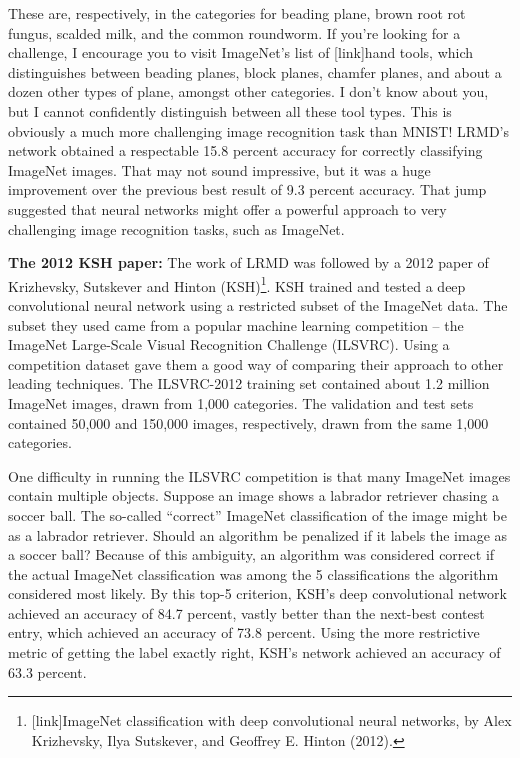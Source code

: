 \documentclass[a4paper,twoside,10pt]{book}
\begin{document}
These are, respectively, in the categories for beading plane, brown root rot fungus, scalded milk, and the common roundworm. If you're looking for a challenge, I encourage you to visit ImageNet's list of [link]hand tools, which distinguishes between beading planes, block planes, chamfer planes, and about a dozen other types of plane, amongst other categories. I don't know about you, but I cannot confidently distinguish between all these tool types. This is obviously a much more challenging image recognition task than MNIST! LRMD's network obtained a respectable 15.8 percent accuracy for correctly classifying ImageNet images. That may not sound impressive, but it was a huge improvement over the previous best result of 9.3 percent accuracy. That jump suggested that neural networks might offer a powerful approach to very challenging image recognition tasks, such as ImageNet.

\textbf{The 2012 KSH paper:} The work of LRMD was followed by a 2012 paper of Krizhevsky, Sutskever and Hinton (KSH)\footnote{[link]ImageNet classification with deep convolutional neural networks, by Alex Krizhevsky, Ilya Sutskever, and Geoffrey E. Hinton (2012).}. KSH trained and tested a deep convolutional neural network using a restricted subset of the ImageNet data. The subset they used came from a popular machine learning competition -- the ImageNet Large-Scale Visual Recognition Challenge (ILSVRC). Using a competition dataset gave them a good way of comparing their approach to other leading techniques. The ILSVRC-2012 training set contained about 1.2 million ImageNet images, drawn from 1,000 categories. The validation and test sets contained 50,000 and 150,000 images, respectively, drawn from the same 1,000 categories.

One difficulty in running the ILSVRC competition is that many ImageNet images contain multiple objects. Suppose an image shows a labrador retriever chasing a soccer ball. The so-called ``correct'' ImageNet classification of the image might be as a labrador retriever. Should an algorithm be penalized if it labels the image as a soccer ball? Because of this ambiguity, an algorithm was considered correct if the actual ImageNet classification was among the 5 classifications the algorithm considered most likely. By this top-5 criterion, KSH's deep convolutional network achieved an accuracy of 84.7 percent, vastly better than the next-best contest entry, which achieved an accuracy of 73.8 percent. Using the more restrictive metric of getting the label exactly right, KSH's network achieved an accuracy of 63.3 percent.
\end{document}
